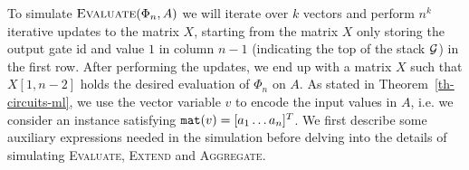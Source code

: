 
To simulate $\textsc{Evaluate}(\Phi_n,A)$ we will iterate over $k$ vectors and perform
$n^k$ iterative updates to the matrix $X$, starting from the matrix $X$ only storing the output gate id and value $1$ in column $n-1$
(indicating the top of the stack $\mathcal{G}$) in the first row. After performing the updates, we end up with a matrix $X$ such that $X[1,n-2]$ holds the desired
evaluation of $\Phi_n$ on $A$. As stated in Theorem~\ref{th-circuits-ml}, we use the vector variable $v$ to encode the input values in $A$, i.e. we consider
an instance satisfying $\texttt{mat}(v) = [a_1 \ldots a_n]^T$.  We first describe
some auxiliary \langfor expressions needed in the simulation before delving into the details of simulating \textsc{Evaluate}, \textsc{Extend} and \textsc{Aggregate}.


